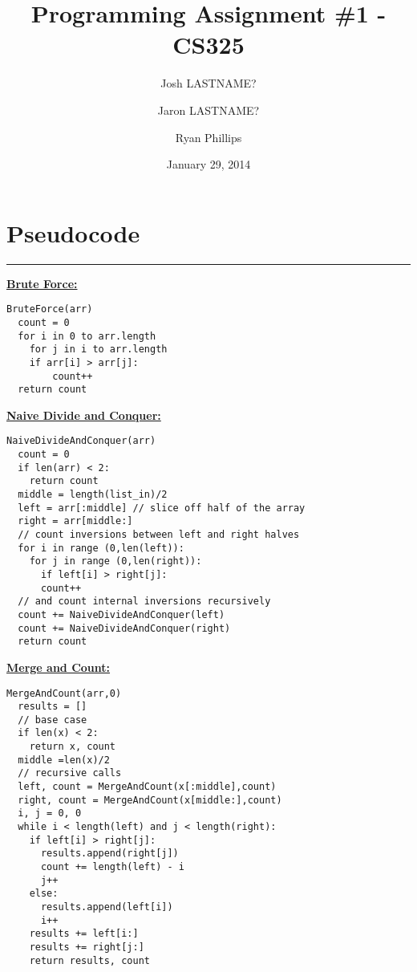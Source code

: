 \documentclass[letterpaper,10pt,titlepage,fleqn]{article}
\begin{document}
\lstset{language=Python} 

\title{Programming Assignment \#1 - CS325}

\author{
	Josh LASTNAME? \and
	Jaron LASTNAME? \and
	Ryan Phillips
}

\date{January 29, 2014}
\maketitle

\section*{Pseudocode}
\hrule
\begin{centering}

\underline{\large{\textbf{Brute Force:}}}\\
\end{centering}
\begin{lstlisting}
BruteForce(arr)
  count = 0
  for i in 0 to arr.length
    for j in i to arr.length
	if arr[i] > arr[j]:
        count++ 
  return count
\end{lstlisting}

\begin{centering}
\underline{\large{\textbf{Naive Divide and Conquer:}}}\\
\end{centering}
\begin{lstlisting}
NaiveDivideAndConquer(arr)
  count = 0
  if len(arr) < 2:
    return count
  middle = length(list_in)/2
  left = arr[:middle] // slice off half of the array
  right = arr[middle:]
  // count inversions between left and right halves
  for i in range (0,len(left)):
    for j in range (0,len(right)):
      if left[i] > right[j]:
	  count++
  // and count internal inversions recursively
  count += NaiveDivideAndConquer(left)
  count += NaiveDivideAndConquer(right)
  return count
\end{lstlisting}

\begin{centering}
\underline{\large{\textbf{Merge and Count:}}}\\
\end{centering}

\begin{lstlisting}
MergeAndCount(arr,0)
  results = []
  // base case
  if len(x) < 2:
    return x, count
  middle =len(x)/2
  // recursive calls
  left, count = MergeAndCount(x[:middle],count)
  right, count = MergeAndCount(x[middle:],count)
  i, j = 0, 0
  while i < length(left) and j < length(right):
    if left[i] > right[j]:
      results.append(right[j])
      count += length(left) - i
      j++
    else:
      results.append(left[i])
      i++
    results += left[i:]
    results += right[j:]
    return results, count
\end{lstlisting}
\end{document}

